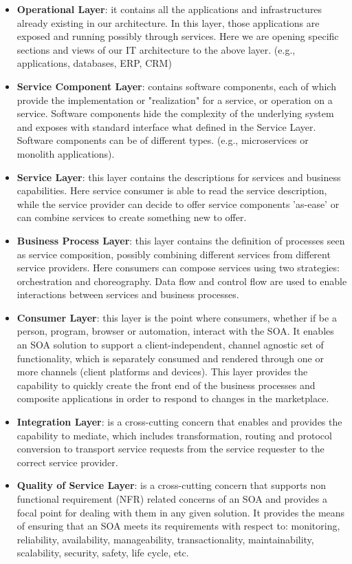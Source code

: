 \documentclass[10pt,a4paper]{article}
\begin{document}
\begin{itemize}
	\item \textbf{Operational Layer}: it contains all the applications and infrastructures already existing in our architecture. In this layer, those applications are exposed and running possibly through services. Here we are opening specific sections and views of our IT architecture to the above layer. (e.g., applications, databases, ERP, CRM)
	\item \textbf{Service Component Layer}: contains software components, each of which provide the implementation or "realization" for a service, or operation on a service. Software components hide the complexity of the underlying system and exposes with standard interface what defined in the Service Layer. Software components can be of different types. (e.g., microservices or monolith applications).
	\item \textbf{Service Layer}: this layer contains the descriptions for services and business capabilities. Here service consumer is able to read the service description, while the service provider can decide to offer service components 'as-ease' or can combine services to create something new to offer.
	\item \textbf{Business Process Layer}: this layer contains the definition of processes seen as service composition, possibly combining different services from different service providers. Here consumers can compose services using two strategies: orchestration and choreography. Data flow and control flow are used to enable interactions between services and business processes.
	\item \textbf{Consumer Layer}: this layer is the point where consumers, whether if be a person, program, browser or automation, interact with the SOA. It enables an SOA solution to support a client-independent, channel agnostic set of functionality, which is separately consumed and rendered through one or more channels (client platforms and devices). This layer provides the capability to quickly create the front end of the business processes and composite applications in order to respond to changes in the marketplace.
	\item \textbf{Integration Layer}:  is a cross-cutting concern that enables and provides the capability to mediate, which includes transformation, routing and protocol conversion to transport service requests from the service requester to the correct service provider.
	\item \textbf{Quality of Service Layer}: is a cross-cutting concern that supports non functional requirement (NFR) related concerns of an SOA and provides a focal point for dealing with them in any given solution. It provides the means of ensuring that an SOA meets its requirements with respect to: monitoring, reliability, availability, manageability, transactionality, maintainability, scalability, security, safety, life cycle, etc.

\end{itemize}
\end{document}

